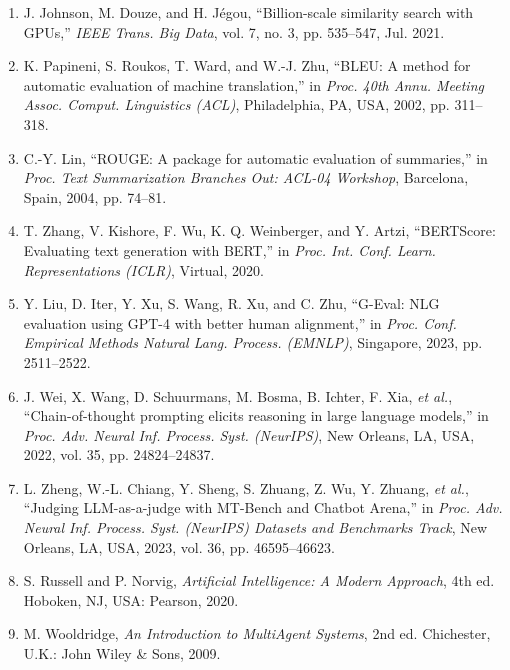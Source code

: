 \begin{enumerate}
\item\label{ref:johnson2021}
  J. Johnson, M. Douze, and H. Jégou, ``Billion-scale similarity search with
  GPUs,'' \emph{IEEE Trans. Big Data}, vol. 7, no. 3, pp. 535--547,
  Jul. 2021.

\item\label{ref:papineni2002}
  K. Papineni, S. Roukos, T. Ward, and W.-J. Zhu, ``BLEU: A method for
  automatic evaluation of machine translation,'' in \emph{Proc. 40th Annu.
  Meeting Assoc. Comput. Linguistics (ACL)}, Philadelphia, PA, USA, 2002,
  pp. 311--318.

\item\label{ref:lin2004}
  C.-Y. Lin, ``ROUGE: A package for automatic evaluation of summaries,'' in
  \emph{Proc. Text Summarization Branches Out: ACL-04 Workshop}, Barcelona,
  Spain, 2004, pp. 74--81.

\item\label{ref:zhang2020}
  T. Zhang, V. Kishore, F. Wu, K. Q. Weinberger, and Y. Artzi, ``BERTScore:
  Evaluating text generation with BERT,'' in \emph{Proc. Int. Conf. Learn.
  Representations (ICLR)}, Virtual, 2020.

\item\label{ref:liu2023}
  Y. Liu, D. Iter, Y. Xu, S. Wang, R. Xu, and C. Zhu, ``G-Eval: NLG
  evaluation using GPT-4 with better human alignment,'' in \emph{Proc. Conf.
  Empirical Methods Natural Lang. Process. (EMNLP)}, Singapore, 2023,
  pp. 2511--2522.

\item\label{ref:wei2022}
  J. Wei, X. Wang, D. Schuurmans, M. Bosma, B. Ichter, F. Xia,
  \emph{et al.}, ``Chain-of-thought prompting elicits reasoning in large
  language models,'' in \emph{Proc. Adv. Neural Inf. Process. Syst.
  (NeurIPS)}, New Orleans, LA, USA, 2022, vol. 35, pp. 24824--24837.

\item\label{ref:zheng2023}
  L. Zheng, W.-L. Chiang, Y. Sheng, S. Zhuang, Z. Wu, Y. Zhuang,
  \emph{et al.}, ``Judging LLM-as-a-judge with MT-Bench and Chatbot Arena,''
  in \emph{Proc. Adv. Neural Inf. Process. Syst. (NeurIPS) Datasets and
  Benchmarks Track}, New Orleans, LA, USA, 2023, vol. 36, pp. 46595--46623.

\item\label{ref:russell2020}
  S. Russell and P. Norvig, \emph{Artificial Intelligence: A Modern
  Approach}, 4th ed. Hoboken, NJ, USA: Pearson, 2020.

\item\label{ref:wooldridge2009}
  M. Wooldridge, \emph{An Introduction to MultiAgent Systems}, 2nd ed.
  Chichester, U.K.: John Wiley \& Sons, 2009.


\end{enumerate}
